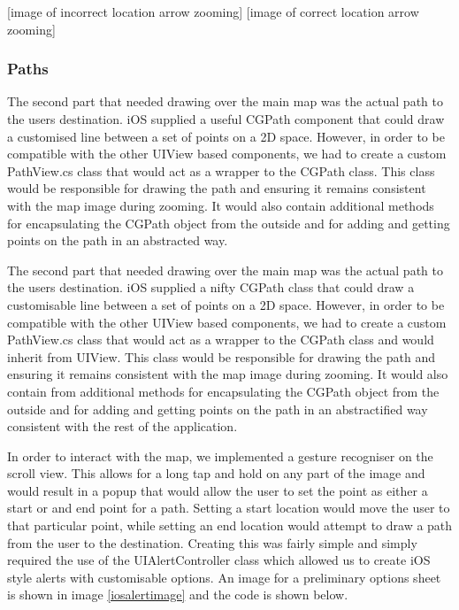 \documentclass[main.tex]{subfiles}
\begin{document}
[image of incorrect location arrow zooming]
[image of correct location arrow zooming]

\subsubsection{Paths}

The second part that needed drawing over the main map was the actual path to the users destination. iOS supplied a useful CGPath component that could draw a customised line between a set of points on a 2D space. However, in order to be compatible with the other UIView based components, we had to create a custom PathView.cs class that would act as a wrapper to the CGPath class. This class would be responsible for drawing the path and ensuring it remains consistent with the map image during zooming. It would also contain additional methods for encapsulating the CGPath object from the outside and for adding and getting points on the path in an abstracted way. 

The second part that needed drawing over the main map was the actual path to the users destination. iOS supplied a nifty CGPath class that could draw a customisable line between a set of points on a 2D space. However, in order to be compatible with the other UIView based components, we had to create a custom PathView.cs class that would act as a wrapper to the CGPath class and would inherit from UIView. This class would be responsible for drawing the path and ensuring it remains consistent with the map image during zooming. It would also contain from additional methods for encapsulating the CGPath object from the outside and for adding and getting points on the path in an abstractified way consistent with the rest of the application.

In order to interact with the map, we implemented a gesture recogniser on the scroll view. This allows for a long tap and hold on any part of the image and would result in a popup that would allow the user to set the point as either a start or and end point for a path. Setting a start location would move the user to that particular point, while setting an end location would attempt to draw a path from the user to the destination. Creating this was fairly simple and simply required the use of the UIAlertController class which allowed us to create iOS style alerts with customisable options. An image for a preliminary options sheet is shown in image \ref{iosalertimage} and the code is shown below.
\end{document}
